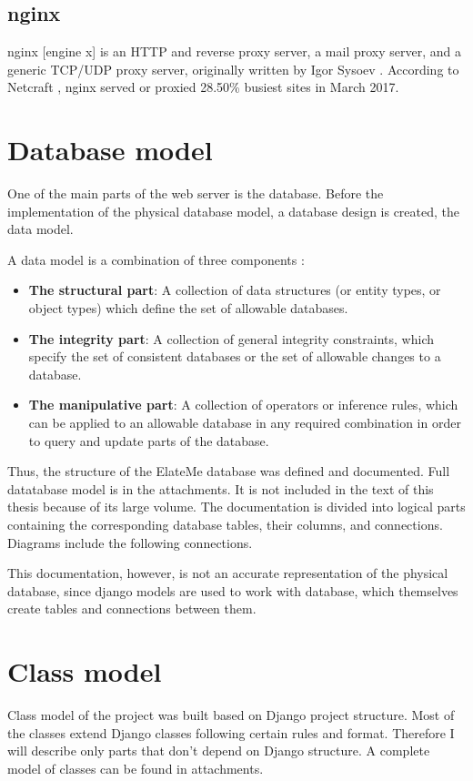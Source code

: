 \subsection{nginx}
nginx [engine x] is an HTTP and reverse proxy server, a mail proxy server, and a generic TCP/UDP proxy server,
originally written by Igor Sysoev \cite{nginx}. According to Netcraft \cite{netcraft}, nginx served or proxied 28.50\%
busiest sites in March 2017.


\newcommand{\dbpart}[1]{
\item \textbf{#1}}
\section{Database model}
One of the main parts of the web server is the database. Before the implementation of the physical database model, a
database design is created, the data model.

A data model is a combination of three components \cite{dbmodel}:

\begin{itemize}
\dbpart{The structural part}: A collection of data structures (or entity types, or object types) which define the set of
allowable databases.
\dbpart{The integrity part}: A collection of general integrity constraints, which specify the set of consistent databases or the
set of allowable changes to a database.
\dbpart{The manipulative part}: A collection of operators or inference rules, which can be applied to an allowable database in
any required combination in order to query and update parts of the database.
\end{itemize}

Thus, the structure of the ElateMe database was defined and documented. Full datatabase model is in the attachments.
It is not included in the text of this thesis because of its large volume. The documentation is divided into logical
parts containing the corresponding database tables, their columns, and connections. Diagrams include the following
connections.


This documentation, however, is not an accurate representation of the physical database, since django models are used to
work with database, which themselves create tables and connections between them.

\section{Class model}
Class model of the project was built based on Django project structure. Most of the classes extend Django classes
following certain rules and format. Therefore I will describe only parts that don't depend on Django structure.
A complete model of classes can be found in attachments.

